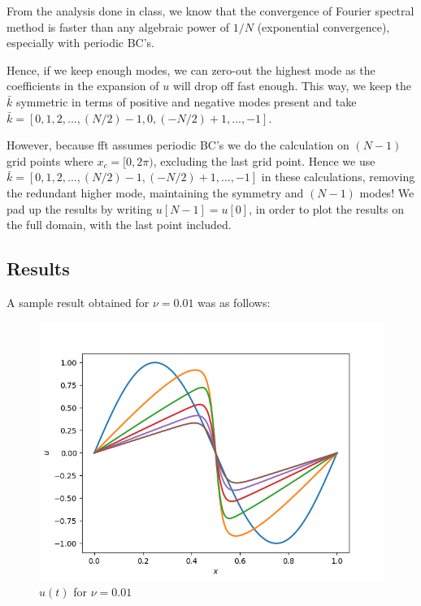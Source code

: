 \documentclass{article}
\begin{document}
From the analysis done in class, we know that the convergence of Fourier spectral method is faster than any algebraic power of $1/N$ (exponential convergence), especially with periodic BC's.

Hence, if we keep enough modes, we can zero-out the highest mode as the coefficients in the expansion of $u$ will drop off fast enough. This way, we keep the $\bar{k}$ symmetric in terms of positive and negative modes present and take $\bar{k} = [0, 1, 2, ..., (N/2)-1, 0, (-N/2)+1, ..., -1]$.

However, because fft assumes periodic BC's we do the calculation on $(N-1)$ grid points where $x_{c} = [0, 2\pi)$, excluding the last grid point. Hence we use $\bar{k} = [0, 1, 2, ..., (N/2)-1, (-N/2)+1, ..., -1]$ in these calculations, removing the redundant higher mode, maintaining the symmetry and $(N-1)$ modes! We pad up the results by writing $u[N-1] = u[0]$, in order to plot the results on the full domain, with the last point included.  
\subsection{Results}
A sample result obtained for $\nu = 0.01$ was as follows:
  \begin{figure}[H]
        \centering
        \includegraphics[scale = 0.6]{Figs/ut_fourier.png}
            \caption{$u(t)$ for $\nu = 0.01$}
        \label{fig:ut_fourier_nu_0_01}
\end{figure}
\end{document}

